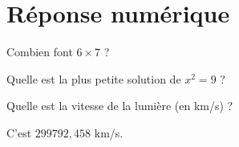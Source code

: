 \documentclass[12pt,a4paper]{article}
\begin{document}
\section{Réponse numérique}

\begin{question}

Combien font $6\times 7$ ?

\begin{answers}       
\end{answers}

\end{question}



\begin{question}

Quelle est la plus petite solution de $x^2=9$ ?

\begin{answers}       
\end{answers}

\end{question}



\begin{question}

Quelle est la vitesse de la lumière (en km/s) ?

\begin{answers}       
\end{answers}

\begin{explanations}
C'est $299792,458$ km/s.
\end{explanations}

\end{question}
\end{document}
